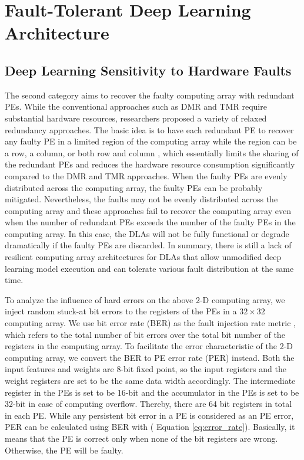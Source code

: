 \section{Fault-Tolerant Deep Learning Architecture}
\subsection{Deep Learning Sensitivity to Hardware Faults}\label{sec:eqerror}
The second category aims to recover the faulty computing array with redundant PEs. While the conventional approaches such as DMR and TMR require substantial hardware resources, researchers proposed a variety of relaxed redundancy approaches. The basic idea is to have each redundant PE to recover any faulty PE in a limited region of the computing array while the region can be a row, a column, or both row and column \cite{takanami2012built} \cite{takanami2017built}, which essentially limits the sharing of the redundant PEs and reduces the hardware resource consumption significantly compared to the DMR and TMR approaches. When the faulty PEs are evenly distributed across the computing array, the faulty PEs can be probably mitigated. Nevertheless, the faults may not be evenly distributed across the computing array and these approaches fail to recover the computing array even when the number of redundant PEs exceeds the number of the faulty PEs in the computing array. In this case, the DLAs will not be fully functional or degrade dramatically if the faulty PEs are discarded. In summary, there is still a lack of resilient computing array architectures for DLAs that allow unmodified deep learning model execution and can tolerate various fault distribution at the same time. 

To analyze the influence of hard errors on the above 2-D computing array, we inject random stuck-at bit errors to the registers of the PEs in a $32 \times 32$ computing array. We use bit error rate (BER) as the fault injection rate metric \cite{mittal2020survey}\cite{neggaz2018reliability}\cite{ares2018dac}, which refers to the total number of bit errors over the total bit number of the registers in the computing array. To facilitate the error characteristic of the 2-D computing array, we convert the BER to PE error rate (PER) instead. Both the input features and weights are 8-bit fixed point, so the input registers and the weight registers are set to be the same data width accordingly. The intermediate register in the PEs is set to be 16-bit and the accumulator in the PEs is set to be 32-bit in case of computing overflow. Thereby, there are 64 bit registers in total in each PE. While any persistent bit error in a PE is considered as an PE error, PER can be calculated using BER with ( Equation \ref{eq:error_rate}). Basically, it means that the PE is correct only when none of the bit registers are wrong. Otherwise, the PE will be faulty.

